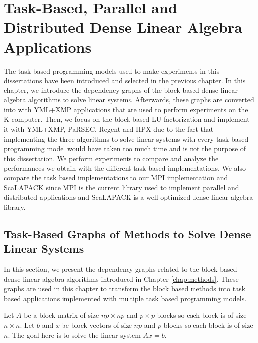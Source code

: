 \chapter{Task-Based, Parallel and Distributed Dense Linear Algebra Applications \label{chap:exp_dense}}
\graphicspath{{chapters/exp_dense/}}

The task based programming models used to make experiments in this dissertations have been introduced and selected in the previous chapter.
In this chapter, we introduce the dependency graphs of the block based dense linear algebra algorithms to solve linear systems.
Afterwards, these graphs are converted into with YML+XMP applications that are used to perform experiments on the K computer.
Then, we focus on the block based LU factorization and implement it with YML+XMP, PaRSEC, Regent and HPX due to the fact that implementing the three algorithms to solve linear systems with every task based programming model would have taken too much time and is not the purpose of this dissertation.
We perform experiments to compare and analyze the performances we obtain with the different task based implementations.
We also compare the task based implementations to our MPI implementation and ScaLAPACK since MPI is the current library used to implement parallel and distributed applications and ScaLAPACK is a well optimized dense linear algebra library.

\section{Task-Based Graphs of Methods to Solve Dense Linear Systems}
In this section, we present the dependency graphs related to the block based dense linear algebra algorithms introduced in Chapter \ref{chap:methods}.
These graphs are used in this chapter to transform the block based methods into task based applications implemented with multiple task based programming models.

Let $A$ be a block matrix of size $np \times np$ and $p \times p$ blocks so each block is of size $n \times n$.
Let $b$ and $x$ be block vectors of size $np$ and $p$ blocks so each block is of size $n$.
The goal here is to solve the linear system $Ax=b$.

